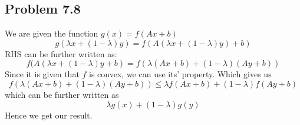\documentclass[letterpaper,12pt]{article}
\theoremstyle{definition}
\begin{document}
\subsection*{Problem 7.8}

We are given the function $ g(x) =  f(Ax+b) $ 
\begin{equation*}
    g(\lambda x + (1-\lambda) y) =  f(A(\lambda x + (1-\lambda)y) + b)
\end{equation*}
RHS can be further written as:
\begin{equation*}
     f(A(\lambda x + (1-\lambda)y + b) = f(\lambda(Ax+b) + (1-\lambda)(Ay+b))
\end{equation*}
Since it is given that $f$ is convex, we can use its' property. Which gives us 
\begin{equation*}
    f(\lambda(Ax+b) + (1-\lambda)(Ay+b)) \leq  \lambda f(Ax+b) + (1-\lambda)f(Ay+b)
\end{equation*}
which can be further written as
\begin{equation*}
    \lambda g(x) + (1-\lambda)g(y)
\end{equation*}
Hence we get our result.
\end{document}
